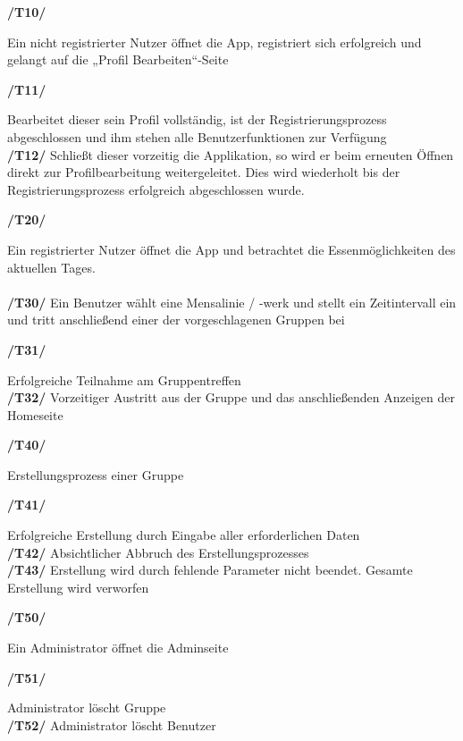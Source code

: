 \documentclass[a4paper]{scrreprt}
\begin{document}
\begin{addmargin}[25pt]{0pt}
\hypertarget{t10}{\textbf{/T10/}} Ein nicht registrierter Nutzer öffnet die App, registriert sich erfolgreich und gelangt auf die „Profil Bearbeiten“-Seite\\
  \begin{addmargin}[25pt]{0pt}
  \hypertarget{t11}{\textbf{/T11/}} Bearbeitet dieser sein Profil vollständig, ist der Registrierungsprozess abgeschlossen und ihm stehen alle Benutzerfunktionen zur Verfügung\\
  \hypertarget{t12}{\textbf{/T12/}} Schließt dieser vorzeitig die Applikation, so wird er beim erneuten Öffnen direkt zur Profilbearbeitung weitergeleitet. Dies wird wiederholt bis der Registrierungsprozess erfolgreich abgeschlossen wurde.\\
  \end{addmargin}
\hypertarget{t20}{\textbf{/T20/}} Ein registrierter Nutzer öffnet die App und betrachtet die Essenmöglichkeiten des aktuellen Tages.\\ \\
\hypertarget{t30}{\textbf{/T30/}} Ein Benutzer wählt eine Mensalinie / -werk und stellt ein Zeitintervall ein und tritt anschließend einer der vorgeschlagenen Gruppen bei\\
  \begin{addmargin}[25pt]{0pt}
  \hypertarget{t31}{\textbf{/T31/}} Erfolgreiche Teilnahme am Gruppentreffen\\
  \hypertarget{t32}{\textbf{/T32/}} Vorzeitiger Austritt aus der Gruppe und das anschließenden Anzeigen der Homeseite\\
  \end{addmargin}
\hypertarget{t40}{\textbf{/T40/}}  Erstellungsprozess einer Gruppe\\
  \begin{addmargin}[25pt]{0pt}
  \hypertarget{t41}{\textbf{/T41/}} Erfolgreiche Erstellung durch Eingabe aller erforderlichen Daten\\
  \hypertarget{t42}{\textbf{/T42/}} Absichtlicher Abbruch des Erstellungsprozesses\\
  \hypertarget{t43}{\textbf{/T43/}} Erstellung wird durch fehlende Parameter nicht beendet. Gesamte Erstellung wird verworfen\\
  \end{addmargin}
\hypertarget{t50}{\textbf{/T50/}} Ein Administrator öffnet die Adminseite\\
  \begin{addmargin}[25pt]{0pt}
  \hypertarget{t10}{\textbf{/T51/}} Administrator löscht Gruppe\\
  \hypertarget{t10}{\textbf{/T52/}} Administrator löscht Benutzer\\
  \end{addmargin}



\end{addmargin}
\end{document}
